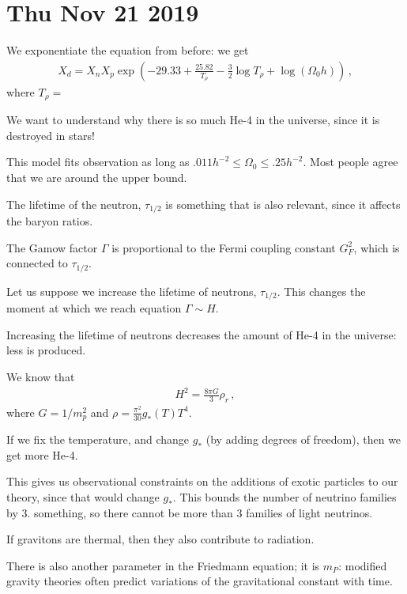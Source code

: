 \documentclass[main.tex]{subfiles}
\begin{document}
\section*{Thu Nov 21 2019}

We exponentiate the equation from before: 
we get 
%
\begin{align}
  X_d = X_n X_p
  \exp(-29.33 + \frac{25.82}{T_\rho  } - \frac{3}{2} \log T_\rho + \log ( \Omega_0 h ))
\,,
\end{align}
%
where \(T_\rho  = \) 

We want to understand why there is so much He-4 in the universe, since it is destroyed in stars! 

This model fits observation as long as \(\num{.011} h^{-2}\leq \Omega_0 \leq \num{.25} h^{-2}\). 
Most people agree that we are around the upper bound. 


The lifetime of the neutron, \(\tau_{1/2}\) is something that is also relevant, since it affects the baryon ratios. 

The Gamow factor \(\Gamma \) is proportional to the Fermi coupling constant \(G_F^2\), which is connected to \(\tau_{1/2}\). 

Let us suppose we increase the lifetime of neutrons, \(\tau_{1/2}\). 
This changes the moment at which we reach equation \(\Gamma \sim H\). 

Increasing the lifetime of neutrons decreases the amount of He-4 in the universe: less is produced. 

We know that 
%
\begin{align}
  H^2 = \frac{8 \pi G}{3} \rho_r
\,,
\end{align}
%
where \(G = 1 / m_p^2\) and \(\rho = \frac{\pi^2}{30} g_{*}(T) T^4\).

If we fix the temperature, and change \(g_{*}\) (by adding degrees of freedom), then we get more He-4. 

This gives us observational constraints on the additions of exotic particles to our theory, since that would change \(g_{*}\). 
This bounds the number of neutrino families by \num{3.} something, so there cannot be more than \num{3} families of light neutrinos. 

If gravitons are thermal, then they also contribute to radiation. 

There is also another parameter in the Friedmann equation; it is \(m_P\): modified gravity theories often predict variations of the gravitational constant with time. 
\end{document}

